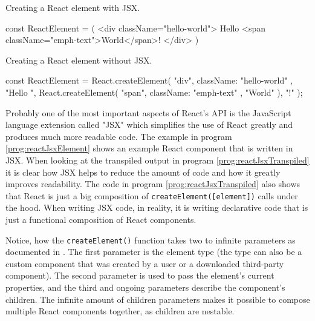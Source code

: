 \begin{program}
\caption{Creating a React element with JSX.} 
\label{prog:reactJsxElement}
\begin{JsCode}
const ReactElement = (
  <div className="hello-world">
    Hello <span className="emph-text">World</span>!
  </div>
)
\end{JsCode}
\end{program}

\begin{program}
\caption{Creating a React element without JSX.} 
\label{prog:reactJsxTranspiled}
\begin{JsCode}
const ReactElement = React.createElement(
  "div", 
  { className: "hello-world" }, 
  "Hello ", 
  React.createElement(
    "span", 
    { className: "emph-text" }, 
    "World"
  ), 
  "!"
);
\end{JsCode}
\end{program}

Probably one of the most important aspects of React's API is the JavaScript language extension called "JSX" which simplifies the use of React greatly and produces much more readable code. The example in program \ref{prog:reactJsxElement} shows an example React component that is written in JSX. When looking at the transpiled output in program \ref{prog:reactJsxTranspiled} it is clear how JSX helps to reduce the amount of code and how it greatly improves readability. The code in program \ref{prog:reactJsxTranspiled} also shows that React is just a big composition of \texttt{createElement([element])} calls under the hood. When writing JSX code, in reality, it is writing declarative code that is just a functional composition of React components. 

Notice, how the \texttt{createElement()} function takes two to infinite parameters as documented in \cite[/docs/react-api.html]{React}. The first parameter is the element type (the type can also be a custom component that was created by a user or a downloaded third-party component). The second parameter is used to pass the element's current properties, and the third and ongoing parameters describe the component's children. The infinite amount of children parameters makes it possible to compose multiple React components together, as children are nestable. 

